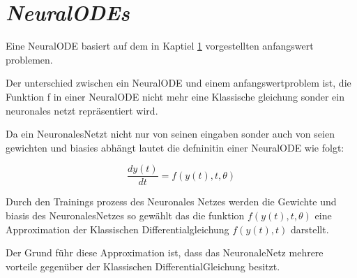 \section{\textit{NeuralODEs}}

Eine NeuralODE basiert auf dem in Kaptiel \ref{} vorgestellten anfangswert problemen.

Der unterschied zwischen ein NeuralODE und einem anfangswertproblem ist, 
die Funktion f in einer NeuralODE nicht mehr eine Klassische gleichung sonder ein 
neuronales netzt repräsentiert wird.

Da ein NeuronalesNetzt nicht nur von seinen eingaben sonder auch von seien gewichten und biasies abhängt
lautet die defninitin einer NeuralODE wie folgt:

$$
\frac{d y(t)}{dt} = f(y(t), t, \theta)
$$

Durch den Trainings prozess des Neuronales Netzes werden die Gewichte und biasis des NeuronalesNetzes 
so gewählt das die funktion $f(y(t), t, \theta)$ eine Approximation der Klassischen Differentialgleichung 
$f(y(t), t)$ darstellt.

Der Grund führ diese Approximation ist, dass das NeuronaleNetz mehrere vorteile gegenüber der Klassischen DifferentialGleichung besitzt.







